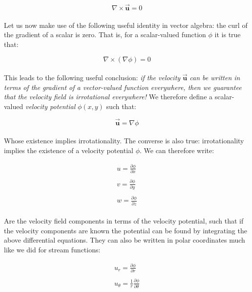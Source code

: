 \documentclass[11pt]{article}
\begin{document}
\begin{equation*}
    \nabla \times \vec{\bm{u}} = 0
\end{equation*}\\
\noindent
Let us now make use of the following useful identity in vector algebra: the curl of the gradient of a scalar is zero. That is, for a scalar-valued function $\phi$ it is true that:

\begin{equation*}
    \nabla \times (\nabla\phi) = 0
\end{equation*}\\
\noindent
This leads to the following useful conclusion: \emph{if the velocity} $\vec{\bm{u}}$ \emph{can be written in terms of the gradient of a vector-valued function everywhere, then we guarantee that the velocity field is irrotational everywhere!} We therefore define a scalar-valued \emph{velocity potential} $\phi(x,y)$ such that:

\begin{equation}\label{velocitypotential}
    \vec{\bm{u}} = \nabla \phi
\end{equation}\\
\noindent
Whose existence implies irrotationality. The converse is also true: irrotationality implies the existence of a velocity potential $\phi$. We can therefore write:

\begin{equation*}
    \begin{matrix}
        u = \frac{\partial \phi}{\partial x} \\ \\
        v = \frac{\partial \phi}{\partial y} \\ \\
        w = \frac{\partial \phi}{\partial z}
    \end{matrix}
\end{equation*}\\
\noindent
Are the velocity field components in terms of the velocity potential, such that if the velocity components are known the potential can be found by integrating the above differential equations. They can also be written in polar coordinates much like we did for stream functions:

\begin{equation*}
    \begin{matrix}
        u_r = \frac{\partial \phi}{\partial r} \\ \\
        u_\theta = \frac{1}{r}\frac{\partial \phi}{\partial \theta}
    \end{matrix}
\end{equation*}
\end{document}
